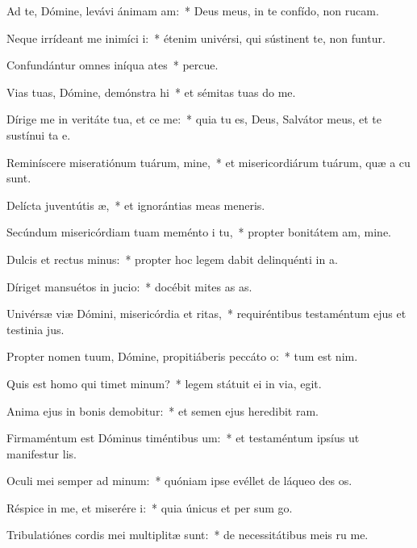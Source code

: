 \item Ad te, Dómine, levávi ánimam am:~* Deus meus, in te confído, non rucam.
\item Neque irrídeant me inimíci i:~* étenim univérsi, qui sústinent te, non funtur.
\item Confundántur omnes iníqua ates~* percue.
\item Vias tuas, Dómine, demónstra hi~* et sémitas tuas do me.
\item Dírige me in veritáte tua, et ce me:~* quia tu es, Deus, Salvátor meus, et te sustínui ta e.
\item Reminíscere miseratiónum tuárum, mine,~* et misericordiárum tuárum, quæ a cu sunt.
\item Delícta juventútis æ,~* et ignorántias meas  meneris.
\item Secúndum misericórdiam tuam meménto i tu,~* propter bonitátem am, mine.
\item Dulcis et rectus minus:~* propter hoc legem dabit delinquénti in a.
\item Díriget mansuétos in jucio:~* docébit mites as as.
\item Univérsæ viæ Dómini, misericórdia et ritas,~* requiréntibus testaméntum ejus et testinia jus.
\item Propter nomen tuum, Dómine, propitiáberis peccáto o:~* tum est nim.
\item Quis est homo qui timet minum?~* legem státuit ei in via,  egit.
\item Anima ejus in bonis demobitur:~* et semen ejus heredibit ram.
\item Firmaméntum est Dóminus timéntibus um:~* et testaméntum ipsíus ut manifestur lis.
\item Oculi mei semper ad minum:~* quóniam ipse evéllet de láqueo des os.
\item Réspice in me, et miserére i:~* quia únicus et per sum go.
\item Tribulatiónes cordis mei multiplitæ sunt:~* de necessitátibus meis ru me.
